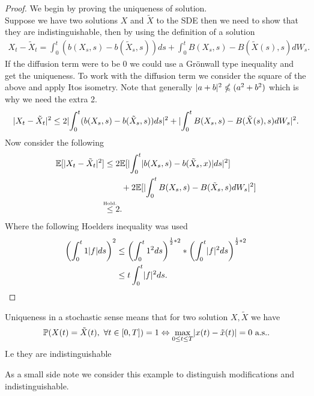 \begin{proof}
  We begin by proving the uniqueness of solution. \\[1ex] 
  Suppose we have two solutions $X$ and $\tilde{X} $ to the SDE then we need to show that they are indistinguishable,
  then by using the definition of a solution 
  \begin{align*}
    X_t - \tilde{X}_t = \int_0^{t} (b(X_s,s) - b(\tilde{X}_s,s )) ds + \int_0^{t} B(X_s,s) - B(\tilde{X}(s),s )  dW_s
  .\end{align*}
  If the diffusion term were to be 0 we could use a Grönwall type inequality and get the uniqueness. 
  To work with the diffusion term we consider the square of the above and apply Itos isometry. Note that
  generally $\lvert a+b\rvert^2 \nleqslant  (a^2+b^2)$  which is why we need the extra 2.
  \begin{align*}
    \lvert X_t - \tilde{X}_t\rvert^2 \le  2\lvert\int_0^{t} (b(X_s,s) - b(\tilde{X}_s,s )) ds\rvert^2 + \lvert\int_0^{t} B(X_s,s) - B(\tilde{X}(s),s )  dW_s\rvert^2
  .\end{align*}
  Now consider the following 
  \begin{align*}
    \E[\abs{X_t-\tilde{X}_t}^2] &\le 2\E[\abs{\int_0^{t} \abs{b(X_s,s) - b(\tilde{X}_s,x )} ds}^2 ]  \\
                                & \qquad + 2 \E[\abs{\int_0^{t} B(X_s,s) - B(\tilde{X}_s,s ) dW_s}^2]\\
                                &\myS{Hold.}{\le } 2
  .\end{align*}
 Where the following Hoelders inequality was used 
 \begin{align*}
   \left( \int_0^{t} 1 \lvert f\rvert ds  \right)^2 &\le  \left( \int_0^{t} 1^2 ds  \right)^{\frac{1}{2}*2}*\left( \int_0^{t} \lvert f\rvert^2 ds  \right)^{\frac{1}{2}*2}  \\
                                             &\le t \int_0^{t} \lvert f\rvert^2 ds 
 .\end{align*}
\end{proof}
\begin{remark}
 Uniqueness in a stochastic sense means that for two solution $X,\tilde{X} $ we have
 \begin{align*}
   \mathbb{P}(X(t) = \tilde{X}(t), \ \forall  t \in  [0,T] ) = 1 \Leftrightarrow \max_{0\le t \le T} \lvert x(t)-\tilde{x}(t) \rvert  = 0 \text{ a.s.}
 .\end{align*}
 I.e they are indistinguishable 
\end{remark}
As a small side note we consider this example to distinguish modifications and indistinguishable.
